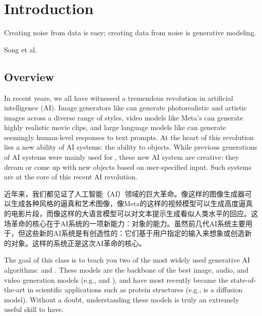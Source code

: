 \section{Introduction}
\label{sec:introduction}
\epigraph{Creating noise from data is easy; creating data from noise is generative modeling.}{Song et al. \cite{yangsong_sde}}


\subsection{Overview}
In recent years, we all have witnessed a tremendous revolution in artificial intelligence (AI). Image generators like  can generate photorealistic and artistic images across a diverse range of styles, video models like Meta's  can generate highly realistic movie clips, and large language models like  can generate seemingly human-level responses to text prompts. At the heart of this revolution lies a new ability of AI systems: the ability to  objects. While previous generations of AI systems were mainly used for , these new AI system are creative: they dream or come up with new objects based on user-specified input. Such  systems are at the core of this recent AI revolution.

近年来，我们都见证了人工智能（AI）领域的巨大革命。像这样的图像生成器可以生成各种风格的逼真和艺术图像，像Meta的这样的视频模型可以生成高度逼真的电影片段，而像这样的大语言模型可以对文本提示生成看似人类水平的回应。这场革命的核心在于AI系统的一项新能力：对象的能力。虽然前几代AI系统主要用于，但这些新的AI系统是有创造性的：它们基于用户指定的输入来想象或创造新的对象。这样的系统正是这次AI革命的核心。  

The goal of this class is to teach you two of the most widely used generative AI algorithms:  \citep{song2020score} and  \citep{lipman2022flow,liu2022flow, albergo2023stochastic, lipman2024flow}. These models are the backbone of the best image, audio, and video generation models (e.g.,  and ), and have most recently became the state-of-the-art in scientific applications such as protein structures (e.g.,  is a diffusion model). Without a doubt, understanding these models is truly an extremely useful skill to have.

